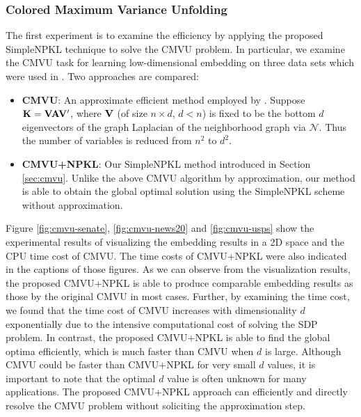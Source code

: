 \subsubsection{Colored Maximum Variance Unfolding}

The first experiment is to examine the efficiency by applying the proposed SimpleNPKL technique to solve the CMVU problem.
In particular, we examine the CMVU task for learning low-dimensional embedding on three data sets which were used in \cite{nips/SongSBG07}. Two approaches are compared:\vspace{-0.1in}
\begin{itemize}
\item {\bf CMVU}: An approximate efficient method employed by \cite{nips/SongSBG07}. Suppose ${\bf K} = {\bf V}{\bf A}{\bf V}'$, where ${\bf V}$ (of size $n \times d$, $d < n$) is fixed to be the bottom $d$ eigenvectors of the graph Laplacian of the neighborhood graph via $\mathcal N$. Thus the number of variables is reduced from $n^2$ to $d^2$.  \vspace{-0.1in}
\item {\bf CMVU+NPKL}: Our SimpleNPKL method introduced in Section \ref{sec:cmvu}. Unlike the above CMVU algorithm by approximation, our method is able to obtain the global optimal solution using the SimpleNPKL scheme without approximation.\vspace{-0.1in}
\end{itemize}

Figure \ref{fig:cmvu-senate}, \ref{fig:cmvu-news20} and \ref{fig:cmvu-usps} show the experimental results of visualizing the embedding results in a 2D space and the CPU time cost of CMVU. The time costs of CMVU+NPKL were also indicated in the captions of those figures.
As we can observe from the visualization results, the proposed CMVU+NPKL is able to produce comparable embedding results as those by the original CMVU in most cases. Further, by examining the time cost, we found that the time cost of CMVU increases with dimensionality $d$ exponentially due to the intensive computational cost of solving the SDP problem. In contrast, the proposed CMVU+NPKL is able to find the global optima efficiently, which is much faster than CMVU when $d$ is large. Although CMVU could be faster than CMVU+NPKL for very small $d$ values, it is important to note that the optimal $d$ value is often unknown for many applications. The proposed CMVU+NPKL approach can efficiently and directly resolve the CMVU problem without soliciting the approximation step.\vspace{-0.1in}


